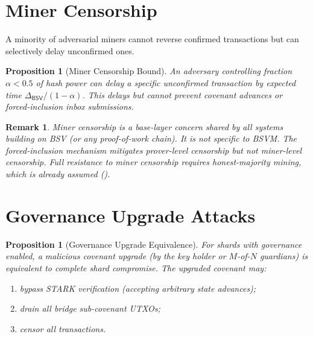 \documentclass[11pt,a4paper]{article}
\newtheorem{proposition}[theorem]{Proposition}
\newtheorem{remark}{Remark}[section]
\newcommand{\BSV}{\mathsf{BSV}}
\begin{document}
\section{Miner Censorship}\label{sec:miner-censorship}

A minority of adversarial miners cannot reverse confirmed transactions but can selectively delay unconfirmed ones.

\begin{proposition}[Miner Censorship Bound]\label{prop:miner-censor}
An adversary controlling fraction $\alpha < 0.5$ of hash power can delay a specific unconfirmed transaction by expected time $\Delta_{\BSV} / (1 - \alpha)$. This delays but cannot prevent covenant advances or forced-inclusion inbox submissions.
\end{proposition}

\begin{remark}
Miner censorship is a base-layer concern shared by all systems building on BSV (or any proof-of-work chain). It is not specific to BSVM. The forced-inclusion mechanism mitigates prover-level censorship but not miner-level censorship. Full resistance to miner censorship requires honest-majority mining, which is already assumed ().
\end{remark}


\section{Governance Upgrade Attacks}\label{sec:governance-attacks}

\begin{proposition}[Governance Upgrade Equivalence]\label{prop:gov-upgrade}
For shards with governance enabled, a malicious covenant upgrade (by the key holder or $M$-of-$N$ guardians) is equivalent to complete shard compromise. The upgraded covenant may:
\begin{enumerate}[nosep,label=(\alph*)]
    \item bypass STARK verification (accepting arbitrary state advances);
    \item drain all bridge sub-covenant UTXOs;
    \item censor all transactions.
\end{enumerate}
\end{proposition}
\end{document}
